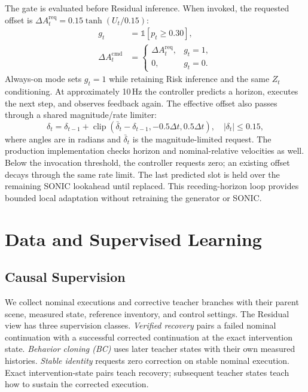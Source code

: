 \documentclass[letterpaper,10pt,conference]{ieeeconf}
\begin{document}
The gate is evaluated before Residual inference. When invoked, the requested offset is $\Delta A_t^{\mathrm{req}}=0.15\tanh(U_t/0.15)$:
\begin{align}
 g_t&=\mathbb{1}[p_t\geq0.30],\\
 \Delta A_t^{\mathrm{cmd}}&=
 \begin{cases}
 \Delta A_t^{\mathrm{req}}, & g_t=1,\\
 0, & g_t=0.
 \end{cases}
\end{align}
Always-on mode sets $g_t=1$ while retaining Risk inference and the same $Z_t$ conditioning. At approximately 10\,Hz the controller predicts a horizon, executes the next step, and observes feedback again. The effective offset also passes through a shared magnitude/rate limiter:
\begin{equation}
 \delta_t=\delta_{t-1}+\operatorname{clip}
 (\bar{\delta}_t-\delta_{t-1},-0.5\Delta t,0.5\Delta t),
 \quad |\delta_t|\leq0.15,
 \label{eq:limiter}
\end{equation}
where angles are in radians and $\bar{\delta}_t$ is the magnitude-limited request. The production implementation checks horizon and nominal-relative velocities as well. Below the invocation threshold, the controller requests zero; an existing offset decays through the same rate limit. The last predicted slot is held over the remaining SONIC lookahead until replaced. This receding-horizon loop provides bounded local adaptation without retraining the generator or SONIC.

\section{Data and Supervised Learning}
\subsection{Causal Supervision}
We collect nominal executions and corrective teacher branches with their parent scene, measured state, reference inventory, and control settings. The Residual view has three supervision classes. \emph{Verified recovery} pairs a failed nominal continuation with a successful corrected continuation at the exact intervention state. \emph{Behavior cloning (BC)} uses later teacher states with their own measured histories. \emph{Stable identity} requests zero correction on stable nominal execution. Exact intervention-state pairs teach recovery; subsequent teacher states teach how to sustain the corrected execution.
\end{document}
